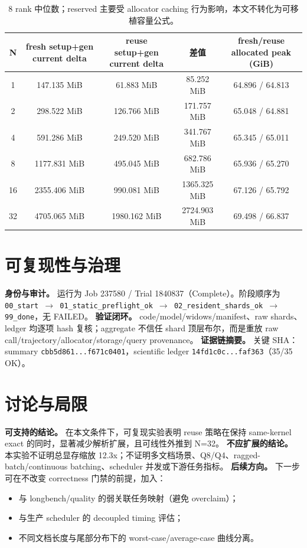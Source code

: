\documentclass[11pt]{article}
\begin{document}
\begin{table}[h]
\centering
\begin{tabular}{ccccc}
\toprule
N & fresh setup+gen current delta & reuse setup+gen current delta & 差值 & fresh/reuse allocated peak (GiB)\\
\midrule
1 & 147.135 MiB & 61.883 MiB & 85.252 MiB & 64.896 / 64.813\\
2 & 298.522 MiB & 126.766 MiB & 171.757 MiB & 65.048 / 64.881\\
4 & 591.286 MiB & 249.520 MiB & 341.767 MiB & 65.345 / 65.011\\
8 & 1177.831 MiB & 495.045 MiB & 682.786 MiB & 65.936 / 65.270\\
16 & 2355.406 MiB & 990.081 MiB & 1365.325 MiB & 67.126 / 65.792\\
32 & 4705.065 MiB & 1980.162 MiB & 2724.903 MiB & 69.498 / 66.837\\
\bottomrule
\end{tabular}
\caption{8 rank 中位数；reserved 主要受 allocator caching 行为影响，本文不转化为可移植容量公式。}
\end{table}

\section{可复现性与治理}
\textbf{身份与审计。} 运行为 Job 237580 / Trial 1840837（Complete）。阶段顺序为
\texttt{00\_start $\rightarrow$ 01\_static\_preflight\_ok $\rightarrow$ 02\_resident\_shards\_ok $\rightarrow$ 99\_done}，无 FAILED。  
\textbf{验证闭环。} code/model/widows/manifest、raw shards、ledger 均逐项 hash 复核；aggregate 不信任 shard 顶层布尔，而是重放 raw call/trajectory/allocator/storage/query provenance。  
\textbf{证据链摘要。} 关键 SHA：summary \texttt{cbb5d861...f671c0401}，scientific ledger \texttt{14fd1c0c...faf363}（35/35 OK）。

\section{讨论与局限}
\textbf{可支持的结论。} 在本文条件下，可复现实验表明 reuse 策略在保持 same-kernel exact 的同时，显著减少解析扩展，且可线性外推到 N=32。  
\textbf{不应扩展的结论。} 本实验不证明总显存缩放 12.3x；不证明多文档场景、Q8/Q4、ragged-batch/continuous batching、scheduler 并发或下游任务指标。  
\textbf{后续方向。} 下一步可在不改变 correctness 门禁的前提，加入：
\begin{itemize}
  \item 与 longbench/quality 的弱关联任务映射（避免 overclaim）；
  \item 与生产 scheduler 的 decoupled timing 评估；
  \item 不同文档长度与尾部分布下的 worst-case/average-case 曲线分离。  
\end{itemize}
\end{document}
